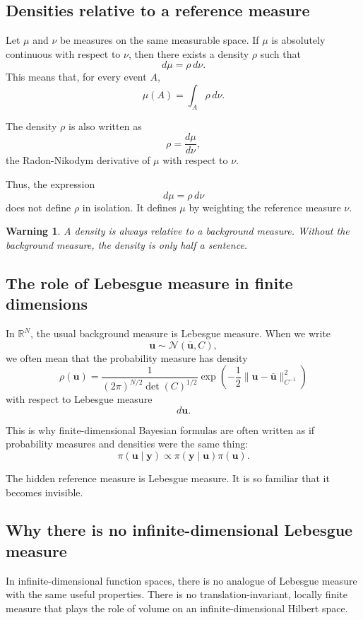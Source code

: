 \documentclass[11pt,a4paper]{book}
\newtheorem{warning}[definition]{Warning}
\newcommand{\R}{\mathbb{R}}
\begin{document}
\subsection{Densities relative to a reference measure}

Let $\mu$ and $\nu$ be measures on the same measurable space. If $\mu$ is
absolutely continuous with respect to $\nu$, then there exists a density
$\rho$ such that
\[
    d\mu = \rho\,d\nu.
\]
This means that, for every event $A$,
\[
    \mu(A)
    =
    \int_A \rho\,d\nu.
\]

The density $\rho$ is also written as
\[
    \rho
    =
    \frac{d\mu}{d\nu},
\]
the Radon-Nikodym derivative of $\mu$ with respect to $\nu$.

Thus, the expression
\[
    d\mu = \rho\,d\nu
\]
does not define $\rho$ in isolation. It defines $\mu$ by weighting the reference
measure $\nu$.

\begin{warning}
A density is always relative to a background measure. Without the background
measure, the density is only half a sentence.
\end{warning}

\subsection{The role of Lebesgue measure in finite dimensions}

In $\R^N$, the usual background measure is Lebesgue measure. When we write
\[
    \bm{u}\sim\mathcal{N}(\bar{\bm{u}},C),
\]
we often mean that the probability measure has density
\[
    \rho(\bm{u})
    =
    \frac{1}{(2\pi)^{N/2}\det(C)^{1/2}}
    \exp
    \left(
        -
        \frac{1}{2}
        \|\bm{u}-\bar{\bm{u}}\|_{C^{-1}}^2
    \right)
\]
with respect to Lebesgue measure
\[
    d\bm{u}.
\]

This is why finite-dimensional Bayesian formulas are often written as if
probability measures and densities were the same thing:
\[
    \pi(\bm{u}\mid \bm{y})
    \propto
    \pi(\bm{y}\mid \bm{u})\pi(\bm{u}).
\]

The hidden reference measure is Lebesgue measure. It is so familiar that it
becomes invisible.

\subsection{Why there is no infinite-dimensional Lebesgue measure}

In infinite-dimensional function spaces, there is no analogue of Lebesgue
measure with the same useful properties. There is no translation-invariant,
locally finite measure that plays the role of volume on an infinite-dimensional
Hilbert space.
\end{document}
